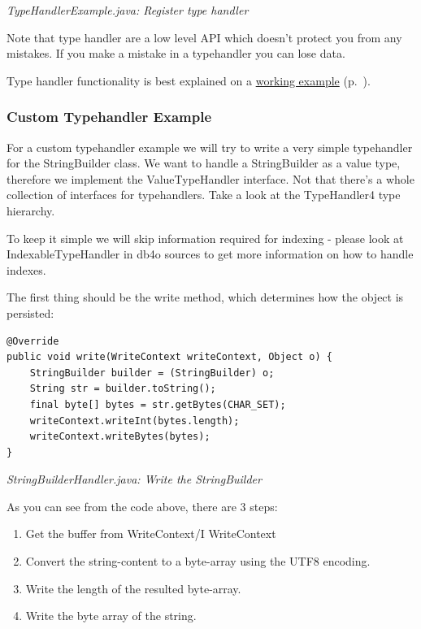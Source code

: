 {\small\itshape TypeHandlerExample.java: Register type handler\par}
\medskip

Note that type handler are a low level API which doesn't protect you from any mistakes. If you make a mistake in a typehandler you can lose data.

Type handler functionality is best explained on a \hyperref[ref:advanced-topics-type-handling-typehandlers-custom-typehandler-example]{working example} (p.~\pageref{ref:advanced-topics-type-handling-typehandlers-custom-typehandler-example}).

\subsubsection{Custom Typehandler Example}
\label{ref:advanced-topics-type-handling-typehandlers-custom-typehandler-example}

For a custom typehandler example we will try to write a very simple typehandler for the StringBuilder class. We want to handle a StringBuilder as a value type, therefore we implement the ValueTypeHandler interface. Not that there's a whole collection of interfaces for typehandlers. Take a look at the TypeHandler4 type hierarchy.

To keep it simple we will skip information required for indexing - please look at IndexableTypeHandler in db4o sources to get more information on how to handle indexes.

The first thing should be the write method, which determines how the object is persisted:

\begin{lstlisting}
@Override
public void write(WriteContext writeContext, Object o) {
    StringBuilder builder = (StringBuilder) o;
    String str = builder.toString();
    final byte[] bytes = str.getBytes(CHAR_SET);
    writeContext.writeInt(bytes.length);
    writeContext.writeBytes(bytes);
}
\end{lstlisting}

{\small\itshape StringBuilderHandler.java: Write the StringBuilder\par}
\medskip

As you can see from the code above, there are 3 steps:

\begin{enumerate}
\item Get the buffer from WriteContext/I WriteContext
\item Convert the string-content to a byte-array using the UTF8 encoding.
\item Write the length of the resulted byte-array.
\item Write the byte array of the string.
\end{enumerate}

